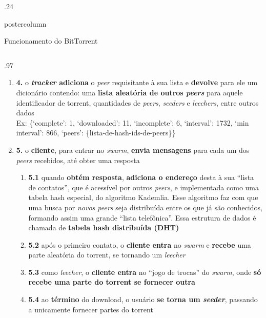 \documentclass[final,brazil]{beamer}
\newenvironment{innercol}[3][.97\textwidth]{
\begin{columns}
  \hspace{#2}
  \begin{column}{#1}
    \vspace{#3}
    \justifying
}{
  \end{column}
\end{columns}
}
\begin{document}
\begin{frame}
\begin{columns}
\begin{column}{.24\textwidth}
\begin{beamercolorbox}[center,wd=\textwidth]{postercolumn}
\begin{minipage}[T]{.95\textwidth}
{\begin{block}{Funcionamento do BitTorrent}
\begin{innercol}{-6ex}{-1.4ex}
\begin{enumerate}
                  \item \textbf{4.} o \textbf{\emph{tracker} adiciona} o \emph{peer}
                    requisitante à sua lista e \textbf{devolve} para ele um dicionário
                    contendo: uma \textbf{lista aleatória de outros \emph{peers}} para
                    aquele identificador de torrent, quantidades de \emph{peers},
                    \emph{seeders} e \emph{leechers}, entre outros dados \\
                    Ex: \{`complete': 1, `downloaded': 11, `incomplete': 6, `interval':
                    1732, `min interval': 866, `peers': \{lista-de-hash-ids-de-peers\}\}

                  \item \textbf{5.} o \textbf{cliente}, para entrar no \emph{swarm},
                    \textbf{envia mensagens} para cada um dos \emph{peers} recebidos,
                    até obter uma resposta

                  \begin{enumerate}
                    \item \textbf{5.1} quando \textbf{obtém resposta}, \textbf{adiciona
                      o endereço} desta à sua ``lista de contatos'', que é
                      acessível por outros \emph{peers}, e implementada como uma tabela
                      hash especial, do algoritmo Kademlia. Esse algoritmo faz com que
                      uma busca por \emph{novos peers} seja distribuída entre os que já
                      são conhecidos, formando assim uma grande ``lista telefônica''.
                      Essa estrutura de dados é chamada de \textbf{tabela hash
                      distribuída (DHT)}

                    \item \textbf{5.2} após o primeiro contato, o \textbf{cliente
                      entra} no \emph{swarm} e \textbf{recebe} uma parte aleatória do
                      torrent, se tornando um \emph{leecher}

                    \item \textbf{5.3} como \emph{leecher}, o \textbf{cliente entra} no
                      ``jogo de trocas'' do \emph{swarm}, onde \textbf{só recebe uma
                      parte do torrent se fornecer outra}

                    \item \textbf{5.4} ao \textbf{término} do download, o usuário
                      \textbf{se torna um \emph{seeder}}, passando a unicamente
                      fornecer partes do torrent
                  \end{enumerate}
                \end{enumerate}
              \end{innercol}
            \end{block}

}
\end{minipage}
\end{beamercolorbox}
\end{column}
\end{columns}
\end{frame}
\end{document}
